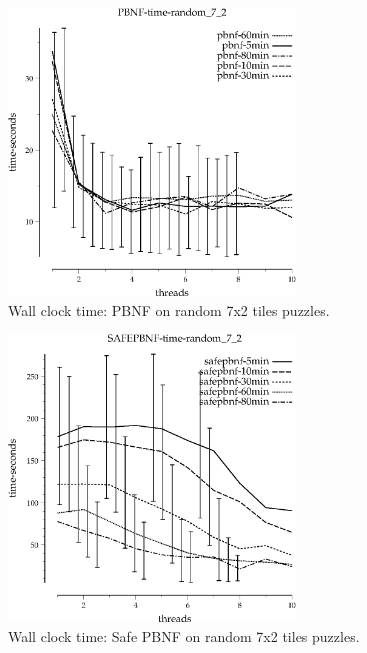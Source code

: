 \documentclass{article}
\begin{document}
\begin{appendices}

\begin{figure}[h]
\begin{center}
\includegraphics[width=3in]{../graphs/tiles_random_7_2/PBNF-time-random_7_2.eps}
\caption{Wall clock time: PBNF on random 7x2 tiles puzzles.}
\end{center}
\end{figure}

\begin{figure}[h]
\begin{center}
\includegraphics[width=3in]{../graphs/tiles_random_7_2/SAFEPBNF-time-random_7_2.eps}
\caption{Wall clock time: Safe PBNF on random 7x2 tiles puzzles.}
\end{center}
\end{figure}


\end{appendices}
\end{document}
